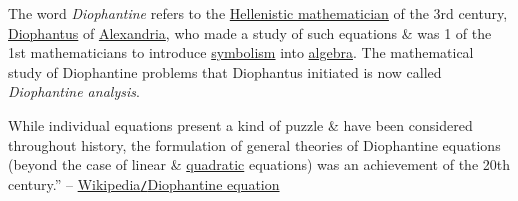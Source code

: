 \documentclass{article}
\numberwithin{equation}{section}
\begin{document}
The word \textit{Diophantine} refers to the \href{https://en.wikipedia.org/wiki/Greek_mathematics#Hellenistic}{Hellenistic mathematician} of the 3rd century, \href{https://en.wikipedia.org/wiki/Diophantus}{Diophantus} of \href{https://en.wikipedia.org/wiki/Alexandria}{Alexandria}, who made a study of such equations \& was 1 of the 1st mathematicians to introduce \href{https://en.wikipedia.org/wiki/Mathematical_symbol}{symbolism} into \href{https://en.wikipedia.org/wiki/Algebra}{algebra}. The mathematical study of Diophantine problems that Diophantus initiated is now called \textit{Diophantine analysis}.

While individual equations present a kind of puzzle \& have been considered throughout history, the formulation of general theories of Diophantine equations (beyond the case of linear \& \href{https://en.wikipedia.org/wiki/Quadratic_equation}{quadratic} equations) was an achievement of the 20th century.'' -- \href{https://en.wikipedia.org/wiki/Diophantine_equation}{Wikipedia\texttt{/}Diophantine equation}
\end{document}
